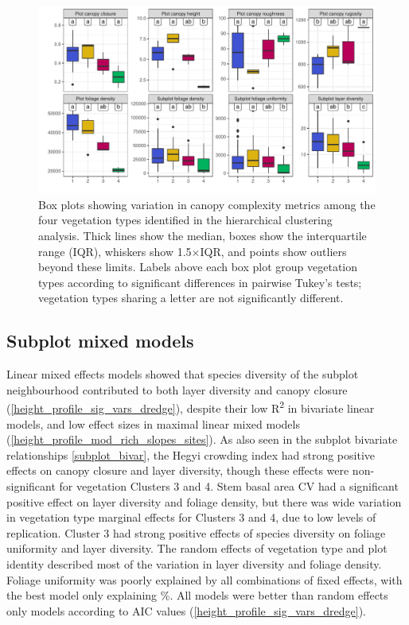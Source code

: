 \documentclass[11pt,a4paper]{article}
\begin{document}
\begin{figure}
	\includegraphics[width=\linewidth]{canopy_metric_box}
	\caption{Box plots showing variation in canopy complexity metrics among the four vegetation types identified in the hierarchical clustering analysis. Thick lines show the median, boxes show the interquartile range (IQR), whiskers show 1.5$\times$IQR, and points show outliers beyond these limits. Labels above each box plot group vegetation types according to significant differences in pairwise Tukey's tests; vegetation types sharing a letter are not significantly different.}
	\label{canopy_metric_box}
\end{figure}



\subsection{Subplot mixed models}

Linear mixed effects models showed that species diversity of the subplot neighbourhood contributed to both layer diversity and canopy closure (\autoref{height_profile_sig_vars_dredge}), despite their low R\textsuperscript{2} in bivariate linear models, and low effect sizes in maximal linear mixed models (\autoref{height_profile_mod_rich_slopes_sites}). As also seen in the subplot bivariate relationships \autoref{subplot_bivar}, the Hegyi crowding index had strong positive effects on canopy closure and layer diversity, though these effects were non-significant for vegetation Clusters 3 and 4. Stem basal area CV had a significant positive effect on layer diversity and foliage density, but there was wide variation in vegetation type marginal effects for Clusters 3 and 4, due to low levels of replication. Cluster 3 had strong positive effects of species diversity on foliage uniformity and layer diversity. The random effects of vegetation type and plot identity described most of the variation in layer diversity and foliage density. Foliage uniformity was poorly explained by all combinations of fixed effects, with the best model only explaining \bestUnifRsqS\%. All models were better than random effects only models according to AIC values (\autoref{height_profile_sig_vars_dredge}).
\end{document}
